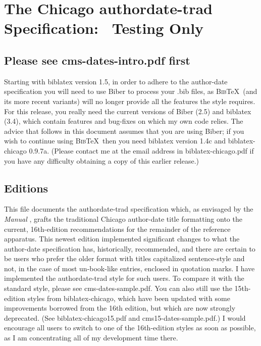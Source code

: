 \documentclass[a4paper,12pt]{report}
\begin{document}
\section*{The Chicago authordate-trad Specification:%
  \ Testing Only}
\label{sec:spec}

\subsection*{Please see cms-dates-intro.pdf first}
\label{bibernote}

Starting with \textsf{biblatex} version 1.5, in order to adhere to the
author-date specification you will need to use \textsf{Biber} to
process your .bib files, as \textsc{Bib}\TeX\ (and its more recent
variants) will no longer provide all the features the style requires.
For this release, you really need the current versions of
\textsf{Biber} (2.5) and \textsf{biblatex} (3.4), which contain
features and bug-fixes on which my own code relies.  The advice that
follows in this document assumes that you are using \textsf{Biber}; if
you wish to continue using \textsc{Bib}\TeX\ then you need
\textsf{biblatex} version 1.4c and \textsf{biblatex-chicago} 0.9.7a.
(Please contact me at the email address in
\textsf{biblatex-chicago.pdf} if you have any difficulty obtaining a
copy of this earlier release.)

\subsection*{Editions}
\label{editions}

This file documents the \textsf{authordate-trad} specification which,
as envisaged by the \emph{Manual} \autocite*[15.45]{chicago:manual},
grafts the traditional Chicago author-date title formatting onto the
current, 16th-edition recommendations for the remainder of the
reference apparatus.  This newest edition implemented significant
changes to what the author-date specification has, historically,
recommended, and there are certain to be users who prefer the older
format with titles capitalized sentence-style and not, in the case of
most un-book-like entries, enclosed in quotation marks.  I have
implemented the \textsf{authordate-trad} style for such users.  To
compare it with the standard style, please see
\textsf{cms-dates-sample.pdf}.  You can also still use the
15th-edition styles from \textsf{biblatex-chicago}, which have been
updated with some improvements borrowed from the 16th edition, but
which are now strongly deprecated.  (See
\textsf{biblatex-chicago15.pdf} and \textsf{cms15-dates-sample.pdf}.)
I would encourage all users to switch to one of the 16th-edition
styles as soon as possible, as I am concentrating all of my
development time there.
\end{document}
